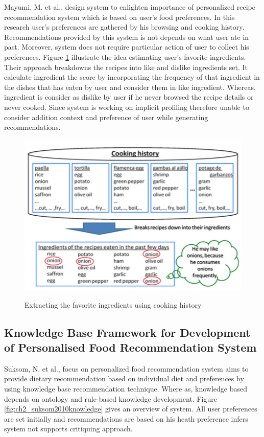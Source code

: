 Mayumi, M. et al., \cite{ueda2011user} design system to enlighten importance of personalized recipe recommendation system which is based on user’s food preferences. In this research user’s preferences are gathered by his browsing and cooking history. Recommendations provided by this system is not depends on what user ate in past. Moreover, system does not require particular action of user to collect his preferences.  Figure \ref{fig:ch2_ueda2011user} illustrate the idea estimating user’s favorite ingredients. Their approach breakdowns the recipes into like and dislike ingredients set. It calculate ingredient the score by incorporating the frequency of that ingredient in the dishes that has eaten by user and consider them in like ingredient. Whereas, ingredient is consider as dislike by user if he never browsed the recipe details or never cooked. Since system is working on implicit profiling therefore unable to consider addition context and preference of user while generating recommendations.

\begin{figure}[h]
	\centering
	\includegraphics[width=1\linewidth]{figures/ch2_ueda2011user.png}
	\caption{Extracting the favorite ingredients using cooking history}
	\cite{ueda2011user}
	\label{fig:ch2_ueda2011user}
\end{figure}

\subsection{Knowledge Base Framework for Development of Personalised Food Recommendation System}
Suksom, N. et al., \cite{suksom2010knowledge} focus on personalized food recommendation system aims to provide dietary recommendation based on individual diet and preferences by using knowledge base recommendation technique. Where as, knowledge based depends on ontology and rule-based knowledge development. Figure \ref{fig:ch2_suksom2010knowledge} gives an overview of system. All user preferences are set initially and recommendations are based on his heath preference infers system not supports critiquing approach.  

